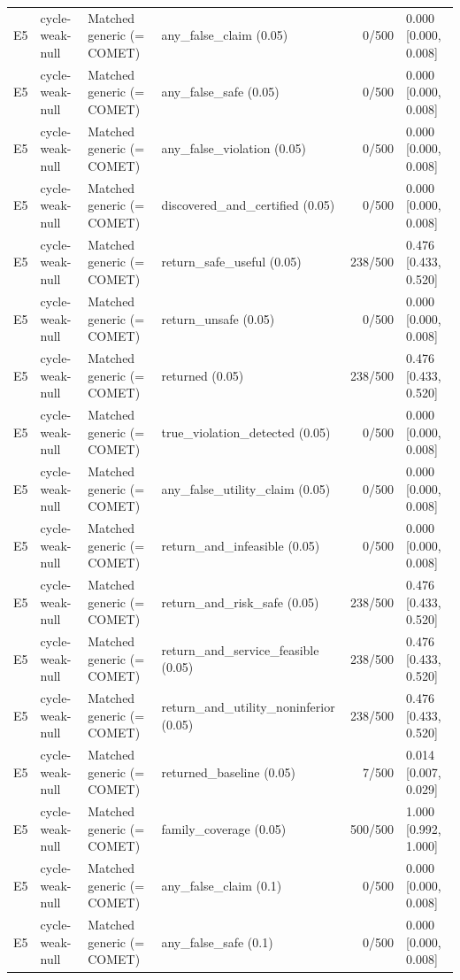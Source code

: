 \begin{longtable}{p{.04\linewidth}p{.18\linewidth}p{.19\linewidth}p{.16\linewidth}r p{.21\linewidth}}
E5 & cycle-weak-null & Matched generic (= COMET) & any\_false\_claim (0.05) & 0/500 & 0.000 [0.000, 0.008]\\
E5 & cycle-weak-null & Matched generic (= COMET) & any\_false\_safe (0.05) & 0/500 & 0.000 [0.000, 0.008]\\
E5 & cycle-weak-null & Matched generic (= COMET) & any\_false\_violation (0.05) & 0/500 & 0.000 [0.000, 0.008]\\
E5 & cycle-weak-null & Matched generic (= COMET) & discovered\_and\_certified (0.05) & 0/500 & 0.000 [0.000, 0.008]\\
E5 & cycle-weak-null & Matched generic (= COMET) & return\_safe\_useful (0.05) & 238/500 & 0.476 [0.433, 0.520]\\
E5 & cycle-weak-null & Matched generic (= COMET) & return\_unsafe (0.05) & 0/500 & 0.000 [0.000, 0.008]\\
E5 & cycle-weak-null & Matched generic (= COMET) & returned (0.05) & 238/500 & 0.476 [0.433, 0.520]\\
E5 & cycle-weak-null & Matched generic (= COMET) & true\_violation\_detected (0.05) & 0/500 & 0.000 [0.000, 0.008]\\
E5 & cycle-weak-null & Matched generic (= COMET) & any\_false\_utility\_claim (0.05) & 0/500 & 0.000 [0.000, 0.008]\\
E5 & cycle-weak-null & Matched generic (= COMET) & return\_and\_infeasible (0.05) & 0/500 & 0.000 [0.000, 0.008]\\
E5 & cycle-weak-null & Matched generic (= COMET) & return\_and\_risk\_safe (0.05) & 238/500 & 0.476 [0.433, 0.520]\\
E5 & cycle-weak-null & Matched generic (= COMET) & return\_and\_service\_feasible (0.05) & 238/500 & 0.476 [0.433, 0.520]\\
E5 & cycle-weak-null & Matched generic (= COMET) & return\_and\_utility\_noninferior (0.05) & 238/500 & 0.476 [0.433, 0.520]\\
E5 & cycle-weak-null & Matched generic (= COMET) & returned\_baseline (0.05) & 7/500 & 0.014 [0.007, 0.029]\\
E5 & cycle-weak-null & Matched generic (= COMET) & family\_coverage (0.05) & 500/500 & 1.000 [0.992, 1.000]\\
E5 & cycle-weak-null & Matched generic (= COMET) & any\_false\_claim (0.1) & 0/500 & 0.000 [0.000, 0.008]\\
E5 & cycle-weak-null & Matched generic (= COMET) & any\_false\_safe (0.1) & 0/500 & 0.000 [0.000, 0.008]\\

\end{longtable}
